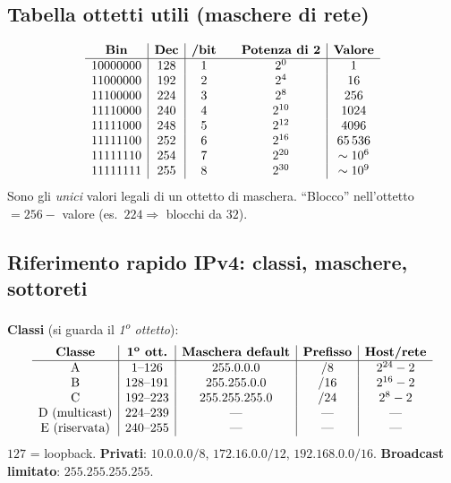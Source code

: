 \documentclass[11pt,a4paper]{report}
\begin{document}
\subsection*{Tabella ottetti utili (maschere di rete)}
\[
\begin{array}{c|c|c @{\quad\quad} c|c}
\textbf{Bin} & \textbf{Dec} & \textbf{/bit} & \textbf{Potenza di 2} & \textbf{Valore} \\ \hline
10000000 & 128 & 1 & 2^0 & 1 \\
11000000 & 192 & 2 & 2^4 & 16 \\
11100000 & 224 & 3 & 2^8 & 256 \\
11110000 & 240 & 4 & 2^{10} & 1024 \\
11111000 & 248 & 5 & 2^{12} & 4096 \\
11111100 & 252 & 6 & 2^{16} & 65\,536 \\
11111110 & 254 & 7 & 2^{20} & \sim 10^6 \\
11111111 & 255 & 8 & 2^{30} & \sim 10^9 \\
\end{array}
\]
Sono gli \emph{unici} valori legali di un ottetto di maschera. ``Blocco''
nell'ottetto $=256-$ valore (es.\ $224\Rightarrow$ blocchi da $32$).

\subsection*{Riferimento rapido IPv4: classi, maschere, sottoreti}
\textbf{Classi} (si guarda il \emph{1\textsuperscript{o} ottetto}):
\[
\begin{array}{c|c|c|c|c}
\textbf{Classe} & \textbf{1\textsuperscript{o} ott.} & \textbf{Maschera default} & \textbf{Prefisso} & \textbf{Host/rete} \\ \hline
\text{A} & 1\text{--}126 & 255.0.0.0 & /8 & 2^{24}-2 \\
\text{B} & 128\text{--}191 & 255.255.0.0 & /16 & 2^{16}-2 \\
\text{C} & 192\text{--}223 & 255.255.255.0 & /24 & 2^{8}-2 \\
\text{D (multicast)} & 224\text{--}239 & \text{---} & \text{---} & \text{---} \\
\text{E (riservata)} & 240\text{--}255 & \text{---} & \text{---} & \text{---} \\
\end{array}
\]
$127$ = loopback. \textbf{Privati}: $10.0.0.0/8$, $172.16.0.0/12$, $192.168.0.0/16$. \textbf{Broadcast limitato}: $255.255.255.255$.
\end{document}
